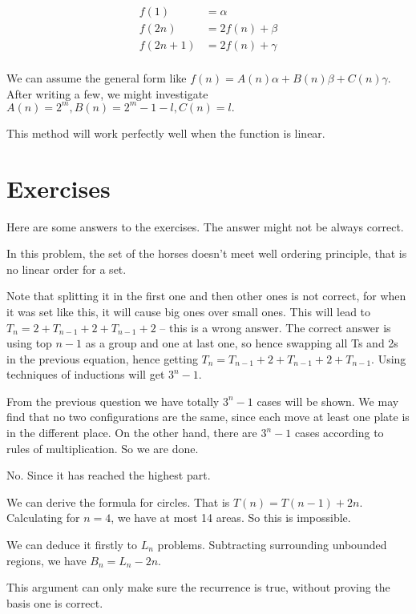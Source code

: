 \begin{align*}
    f(1) &= \alpha \\
    f(2n) &= 2f(n)+\beta \\
    f(2n+1) &= 2f(n)+\gamma \\
\end{align*}

We can assume the general form like $f(n)=A(n)\alpha+B (n) \beta+C(n) \gamma$.
After writing a few, we might investigate $A(n)=2^m, B(n)=2^m-1-l, C(n)=l.$

This method will work perfectly well when the function is linear. 

\section{Exercises}

Here are some answers to the exercises. The answer might not be always correct. 

 In this problem, the set of the horses doesn't meet well ordering
principle, that is no linear order for a set. 

Note that splitting it in the first one and then other ones is not correct,
for when it was set like this, it will cause big ones over small ones. This
will lead to $T_n=2+T_{n-1}+2+T_{n-1}+2$ -- this is a wrong answer. The correct
answer is using top $n-1$ as a group and one at last one, so hence swapping all
Ts and 2s in the previous equation, hence getting
$T_n=T_{n-1}+2+T_{n-1}+2+T_{n-1}$. Using techniques of inductions will get
$3^n-1$. 

From the previous question we have totally $3^n-1$ cases will be shown. We may
find that no two configurations are the same, since each move at least one
plate is in the different place. On the other hand, there are $3^n-1$ cases
according to rules of multiplication. So we are done. 

No. Since it has reached the highest part. 

We can derive the formula for circles. That is $T(n)=T(n-1)+2n$. Calculating
for $n=4$, we have at most 14 areas. So this is impossible.   

We can deduce it firstly to $L_n$ problems. Subtracting surrounding unbounded
regions, we have $B_n = L_n -2n$. 

This argument can only make sure the recurrence is true, without proving the
basis one is correct. 

